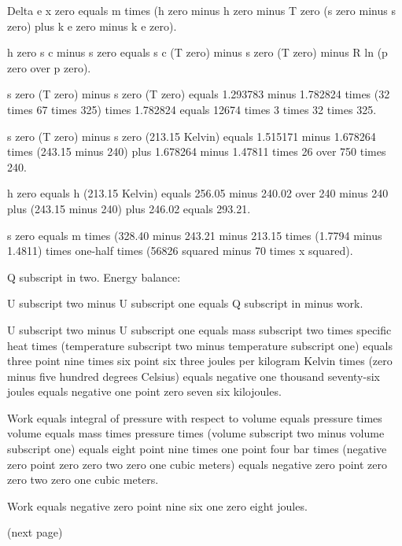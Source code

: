 Delta e x zero equals m times (h zero minus h zero minus T zero (s zero minus s zero) plus k e zero minus k e zero).

h zero
s c minus s zero equals s c (T zero) minus s zero (T zero) minus R ln (p zero over p zero).

s zero (T zero) minus s zero (T zero) equals 1.293783 minus 1.782824 times (32 times 67 times 325) times 1.782824 equals 12674 times 3 times 32 times 325.

s zero (T zero) minus s zero (213.15 Kelvin) equals 1.515171 minus 1.678264 times (243.15 minus 240) plus 1.678264 minus 1.47811 times 26 over 750 times 240.

h zero equals h (213.15 Kelvin) equals 256.05 minus 240.02 over 240 minus 240 plus (243.15 minus 240) plus 246.02 equals 293.21.

s zero equals m times (328.40 minus 243.21 minus 213.15 times (1.7794 minus 1.4811) times one-half times (56826 squared minus 70 times x squared).

Q subscript in two. Energy balance:

U subscript two minus U subscript one equals Q subscript in minus work. 

U subscript two minus U subscript one equals mass subscript two times specific heat times (temperature subscript two minus temperature subscript one) equals three point nine times six point six three joules per kilogram Kelvin times (zero minus five hundred degrees Celsius) equals negative one thousand seventy-six joules equals negative one point zero seven six kilojoules.

Work equals integral of pressure with respect to volume equals pressure times volume equals mass times pressure times (volume subscript two minus volume subscript one) equals eight point nine times one point four bar times (negative zero point zero zero two zero one cubic meters) equals negative zero point zero zero two zero one cubic meters.

Work equals negative zero point nine six one zero eight joules. 

(next page)